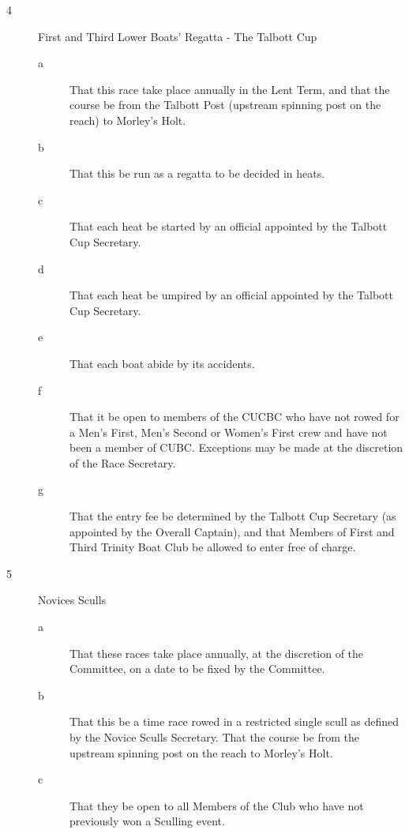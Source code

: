 \documentclass{article}
\begin{document}
\begin{description}
\begin{description}
		\item[4] First and Third Lower Boats’ Regatta - The Talbott Cup
		\begin{description}
			\item[a] That this race take place annually in the Lent Term, and that the course
			be from the Talbott Post (upstream spinning post on the reach) to
			Morley’s Holt.
			\item[b] That this be run as a regatta to be decided in heats.
			\item[c] That each heat be started by an official appointed by the Talbott Cup
			Secretary.
			\item[d] That each heat be umpired by an official appointed by the Talbott Cup
			Secretary.
			\item[e] That each boat abide by its accidents.
			\item[f] That it be open to members of the CUCBC who have not rowed for a
			Men’s First, Men’s Second or Women’s First crew and have not been a
			member of CUBC. Exceptions may be made at the discretion of the
			Race Secretary.
			\item[g] That the entry fee be determined by the Talbott Cup Secretary (as
			appointed by the Overall Captain), and that Members of First and
			Third Trinity Boat Club be allowed to enter free of charge.\\
		\end{description}
	
	\item[5] Novices Sculls
	\begin{description}
		\item[a] That these races take place annually, at the discretion of the
		Committee, on a date to be fixed by the Committee.
		\item[b] That this be a time race rowed in a restricted single scull as defined by
		the Novice Sculls Secretary. That the course be from the upstream
		spinning post on the reach to Morley's Holt.
		\item[c] That they be open to all Members of the Club who have not previously
		won a Sculling event.\\
	\end{description}


\end{description}
\end{description}
\end{document}
